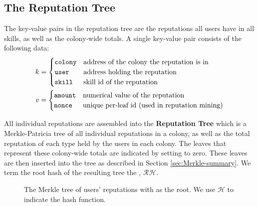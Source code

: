 \subsection{The Reputation Tree}\label{sec:reptree}

The key-value pairs in the reputation tree are the reputations all users have in all skills, as well as the colony-wide totals. A single key-value pair consists of the following data:
\begin{align*}
k &=
  \begin{cases}
  \texttt{colony} & \textnormal{address of the colony the reputation is in}\\
  \texttt{user} & \textnormal{address holding the reputation}\\
  \texttt{skill} & \textnormal{skill id of the reputation}
  \end{cases}\\
v &=
  \begin{cases}
  \texttt{amount} & \textnormal{numerical value of the reputation}\\
  \texttt{nonce} & \textnormal{unique per-leaf id (used in reputation mining)}
  \end{cases}
\end{align*}

All individual reputations are assembled into the \textbf{Reputation Tree} which is a Merkle-Patricia tree of all individual reputations in a colony, as well as the total reputation of each type held by the users in each colony. The leaves that represent these colony-wide totals are indicated by setting  to zero. These leaves are then inserted into the tree as described in Section \ref{sec:Merkle-summary}. We term the root hash of the resulting tree the , $\mathcal{RH}$.
\begin{figure}
\centering
{}
\caption{The Merkle tree of users' reputations with  as the root. We use $\mathcal{H}$ to indicate the  hash function.}
\end{figure}


